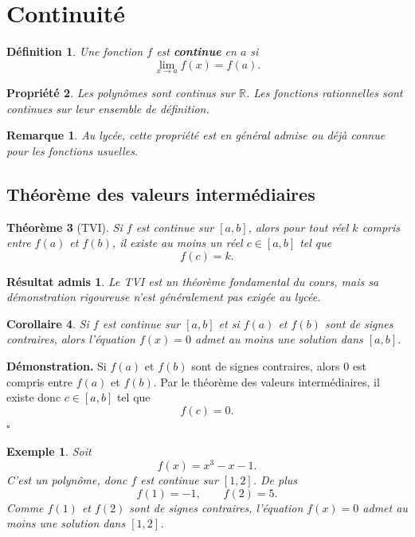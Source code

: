 \documentclass[11pt,a4paper]{article}
\newtheorem{definition}{Définition}[section]
\newtheorem{propriete}[definition]{Propriété}
\newtheorem{theoreme}[definition]{Théorème}
\newtheorem{corollaire}[definition]{Corollaire}
\newtheorem*{exemple}{Exemple}
\newtheorem*{remarque}{Remarque}
\newtheorem*{admis}{Résultat admis}
\newcommand{\R}{\mathbb{R}}
\begin{document}
\section{Continuité}

\begin{definition}
Une fonction \(f\) est \textbf{continue} en \(a\) si
\[
\lim_{x\to a}f(x)=f(a).
\]
\end{definition}

\begin{propriete}
Les polynômes sont continus sur \(\R\). Les fonctions rationnelles sont continues sur leur ensemble de définition.
\end{propriete}

\begin{remarque}
Au lycée, cette propriété est en général admise ou déjà connue pour les fonctions usuelles.
\end{remarque}

\subsection{Théorème des valeurs intermédiaires}

\begin{theoreme}[TVI]
Si \(f\) est continue sur \([a,b]\), alors pour tout réel \(k\) compris entre \(f(a)\) et \(f(b)\), il existe au moins un réel \(c\in[a,b]\) tel que
\[
f(c)=k.
\]
\end{theoreme}

\begin{admis}
Le TVI est un théorème fondamental du cours, mais sa démonstration rigoureuse n'est généralement pas exigée au lycée.
\end{admis}

\begin{corollaire}
Si \(f\) est continue sur \([a,b]\) et si \(f(a)\) et \(f(b)\) sont de signes contraires, alors l'équation \(f(x)=0\) admet au moins une solution dans \([a,b]\).
\end{corollaire}

\textbf{Démonstration.}  
Si \(f(a)\) et \(f(b)\) sont de signes contraires, alors \(0\) est compris entre \(f(a)\) et \(f(b)\).  
Par le théorème des valeurs intermédiaires, il existe donc \(c\in[a,b]\) tel que
\[
f(c)=0.
\]
\(\square\)

\begin{exemple}
Soit
\[
f(x)=x^3-x-1.
\]
C'est un polynôme, donc \(f\) est continue sur \([1,2]\). De plus
\[
f(1)=-1,\qquad f(2)=5.
\]
Comme \(f(1)\) et \(f(2)\) sont de signes contraires, l'équation \(f(x)=0\) admet au moins une solution dans \([1,2]\).
\end{exemple}
\end{document}

